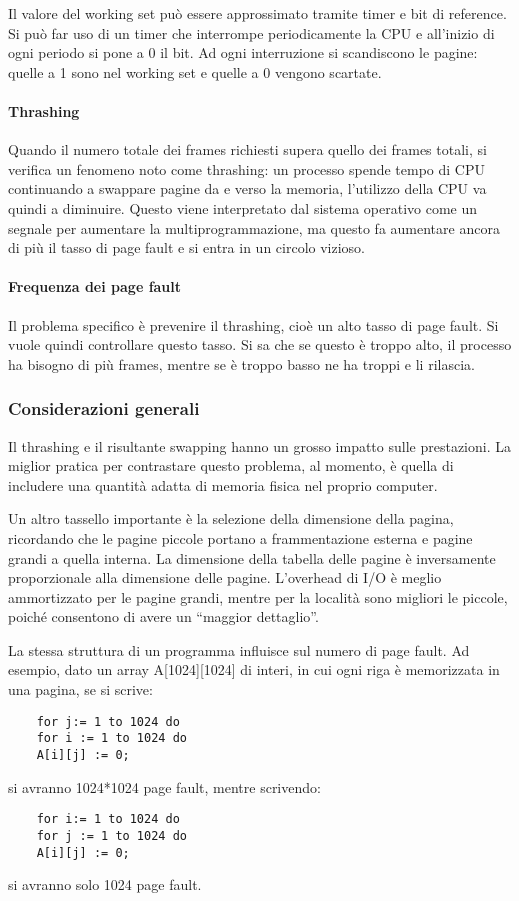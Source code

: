 \documentclass[a4]{article}
\begin{document}
Il valore del working set può essere approssimato tramite timer e bit di reference. Si può far uso di un timer che interrompe periodicamente la CPU e all'inizio di ogni periodo si pone a 0 il bit. Ad ogni interruzione si scandiscono le pagine: quelle a 1 sono nel working set e quelle a 0 vengono scartate.

\paragraph{Thrashing} Quando il numero totale dei frames richiesti supera quello dei frames totali, si verifica un fenomeno noto come thrashing: un processo spende tempo di CPU continuando a swappare pagine da e verso la memoria, l'utilizzo della CPU va quindi a diminuire. Questo viene interpretato dal sistema operativo come un segnale per aumentare la multiprogrammazione, ma questo fa aumentare ancora di più il tasso di page fault e si entra in un circolo vizioso.

\paragraph{Frequenza dei page fault}
Il problema specifico è prevenire il thrashing, cioè un alto tasso di page fault. Si vuole quindi controllare questo tasso. Si sa che se questo è troppo alto, il processo ha bisogno di più frames, mentre se è troppo basso ne ha troppi e li rilascia.

\subsubsection{Considerazioni generali}
Il thrashing e il risultante swapping hanno un grosso impatto sulle prestazioni. La miglior pratica per contrastare questo problema, al momento, è quella di includere una quantità adatta di memoria fisica nel proprio computer.

Un altro tassello importante è la selezione della dimensione della pagina, ricordando che le pagine piccole portano a frammentazione esterna e pagine grandi a quella interna. La dimensione della tabella delle pagine è inversamente proporzionale alla dimensione delle pagine. L'overhead di I/O è meglio ammortizzato per le pagine grandi, mentre per la località sono migliori le piccole, poiché consentono di avere un ``maggior dettaglio''.

La stessa struttura di un programma influisce sul numero di page fault. Ad esempio, dato un array A[1024][1024] di interi, in cui ogni riga è memorizzata in una pagina, se si scrive:
\begin{Verbatim}
    for j:= 1 to 1024 do
    for i := 1 to 1024 do
    A[i][j] := 0;
\end{Verbatim}
si avranno 1024*1024 page fault, mentre scrivendo:
\begin{Verbatim}
    for i:= 1 to 1024 do
    for j := 1 to 1024 do
    A[i][j] := 0;
\end{Verbatim}
si avranno solo 1024 page fault.
\end{document}
